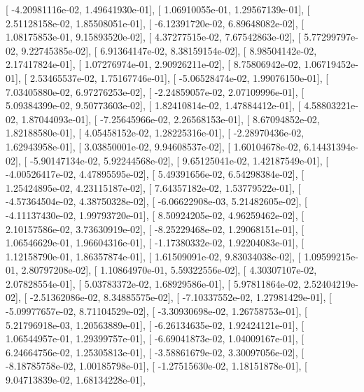 \documentclass{article}
\begin{document}
       [ -4.20981116e-02,   1.49641930e-01],
       [  1.06910055e-01,   1.29567139e-01],
       [  2.51128158e-02,   1.85508051e-01],
       [ -6.12391720e-02,   6.89648082e-02],
       [  1.08175853e-01,   9.15893520e-02],
       [  4.37277515e-02,   7.67542863e-02],
       [  5.77299797e-02,   9.22745385e-02],
       [  6.91364147e-02,   8.38159154e-02],
       [  8.98504142e-02,   2.17417824e-01],
       [  1.07276974e-01,   2.90926211e-02],
       [  8.75806942e-02,   1.06719452e-01],
       [  2.53465537e-02,   1.75167746e-01],
       [ -5.06528474e-02,   1.99076150e-01],
       [  7.03405880e-02,   6.97276253e-02],
       [ -2.24859057e-02,   2.07109996e-01],
       [  5.09384399e-02,   9.50773603e-02],
       [  1.82410814e-02,   1.47884412e-01],
       [  4.58803221e-02,   1.87044093e-01],
       [ -7.25645966e-02,   2.26568153e-01],
       [  8.67094852e-02,   1.82188580e-01],
       [  4.05458152e-02,   1.28225316e-01],
       [ -2.28970436e-02,   1.62943958e-01],
       [  3.03850001e-02,   9.94608537e-02],
       [  1.60104678e-02,   6.14431394e-02],
       [ -5.90147134e-02,   5.92244568e-02],
       [  9.65125041e-02,   1.42187549e-01],
       [ -4.00526417e-02,   4.47895595e-02],
       [  5.49391656e-02,   6.54298384e-02],
       [  1.25424895e-02,   4.23115187e-02],
       [  7.64357182e-02,   1.53779522e-01],
       [ -4.57364504e-02,   4.38750328e-02],
       [ -6.06622908e-03,   5.21482605e-02],
       [ -4.11137430e-02,   1.99793720e-01],
       [  8.50924205e-02,   4.96259462e-02],
       [  2.10157586e-02,   3.73630919e-02],
       [ -8.25229468e-02,   1.29068151e-01],
       [  1.06546629e-01,   1.96604316e-01],
       [ -1.17380332e-02,   1.92204083e-01],
       [  1.12158790e-01,   1.86357874e-01],
       [  1.61509091e-02,   9.83034038e-02],
       [  1.09599215e-01,   2.80797208e-02],
       [  1.10864970e-01,   5.59322556e-02],
       [  4.30307107e-02,   2.07828554e-01],
       [  5.03783372e-02,   1.68929586e-01],
       [  5.97811864e-02,   2.52404219e-02],
       [ -2.51362086e-02,   8.34885575e-02],
       [ -7.10337552e-02,   1.27981429e-01],
       [ -5.09977657e-02,   8.71104529e-02],
       [ -3.30930698e-02,   1.26758753e-01],
       [  5.21796918e-03,   1.20563889e-01],
       [ -6.26134635e-02,   1.92424121e-01],
       [  1.06544957e-01,   1.29399757e-01],
       [ -6.69041873e-02,   1.04009167e-01],
       [  6.24664756e-02,   1.25305813e-01],
       [ -3.58861679e-02,   3.30097056e-02],
       [ -8.18785758e-02,   1.00185798e-01],
       [ -1.27515630e-02,   1.18151878e-01],
       [  9.04713839e-02,   1.68134228e-01],
\end{document}
